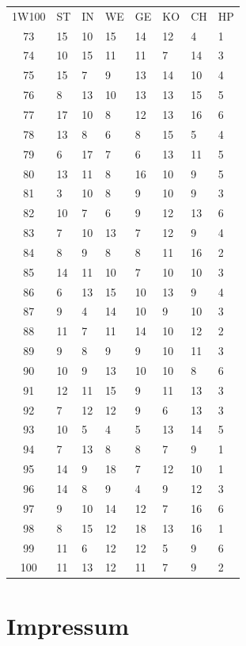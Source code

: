 \documentclass[11pt]{wbzine}
\begin{document}
\begin{tabularx}{\textwidth}{cYYYYYYY}
1W100 & ST & IN & WE & GE & KO & CH & HP \\
  73 & 15 & 10 & 15 & 14 & 12 & 4 & 1 \\
  74 & 10 & 15 & 11 & 11 & 7 & 14 & 3 \\ 
  75 & 15 & 7 & 9 & 13 & 14 & 10 & 4 \\ 
  76 & 8 & 13 & 10 & 13 & 13 & 15 & 5 \\ 
  77 & 17 & 10 & 8 & 12 & 13 & 16 & 6 \\ 
  78 & 13 & 8 & 6 & 8 & 15 & 5 & 4 \\
  79 & 6 & 17 & 7 & 6 & 13 & 11 & 5 \\ 
  80 & 13 & 11 & 8 & 16 & 10 & 9 & 5 \\ 
  81 & 3 & 10 & 8 & 9 & 10 & 9 & 3 \\ 
  82 & 10 & 7 & 6 & 9 & 12 & 13 & 6 \\ 
  83 & 7 & 10 & 13 & 7 & 12 & 9 & 4 \\
  84 & 8 & 9 & 8 & 8 & 11 & 16 & 2 \\ 
  85 & 14 & 11 & 10 & 7 & 10 & 10 & 3 \\
  86 & 6 & 13 & 15 & 10 & 13 & 9 & 4 \\
  87 & 9 & 4 & 14 & 10 & 9 & 10 & 3 \\
  88 & 11 & 7 & 11 & 14 & 10 & 12 & 2 \\ 
  89 & 9 & 8 & 9 & 9 & 10 & 11 & 3 \\ 
  90 & 10 & 9 & 13 & 10 & 10 & 8 & 6 \\
  91 & 12 & 11 & 15 & 9 & 11 & 13 & 3 \\
  92 & 7 & 12 & 12 & 9 & 6 & 13 & 3 \\ 
  93 & 10 & 5 & 4 & 5 & 13 & 14 & 5 \\
  94 & 7 & 13 & 8 & 8 & 7 & 9 & 1 \\ 
  95 & 14 & 9 & 18 & 7 & 12 & 10 & 1 \\ 
  96 & 14 & 8 & 9 & 4 & 9 & 12 & 3 \\
  97 & 9 & 10 & 14 & 12 & 7 & 16 & 6 \\ 
  98 & 8 & 15 & 12 & 18 & 13 & 16 & 1 \\
  99 & 11 & 6 & 12 & 12 & 5 & 9 & 6 \\
  100 & 11 & 13 & 12 & 11 & 7 & 9 & 2 \\ 
  \end{tabularx}

  \section{Impressum}



\begin{multicols}{2}


\end{multicols}
\end{document}
